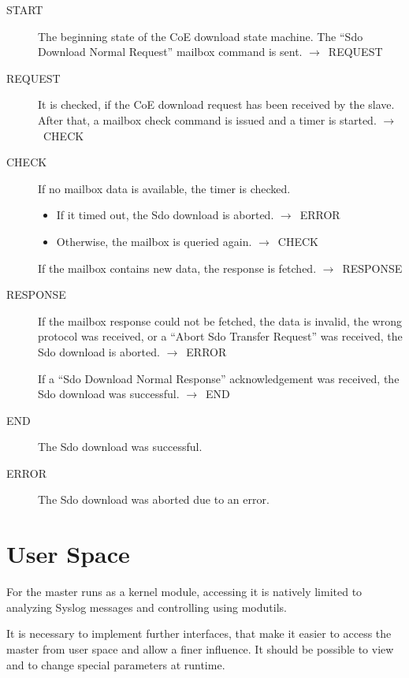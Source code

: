 \documentclass[a4paper,12pt,BCOR6mm,bibtotoc,idxtotoc]{scrbook}
\begin{document}
\begin{description}
\item[START] The beginning state of the CoE download state
  machine. The ``Sdo Download Normal Request'' mailbox command is
  sent. $\rightarrow$~REQUEST

\item[REQUEST] It is checked, if the CoE download request has been
  received by the slave. After that, a mailbox check command is issued
  and a timer is started. $\rightarrow$~CHECK

\item[CHECK] If no mailbox data is available, the timer is checked.
  \begin{itemize}
  \item If it timed out, the Sdo download is aborted.
    $\rightarrow$~ERROR
  \item Otherwise, the mailbox is queried again.
    $\rightarrow$~CHECK
  \end{itemize}

  If the mailbox contains new data, the response is fetched.
  $\rightarrow$~RESPONSE

\item[RESPONSE] If the mailbox response could not be fetched, the data
  is invalid, the wrong protocol was received, or a ``Abort Sdo
  Transfer Request'' was received, the Sdo download is aborted.
  $\rightarrow$~ERROR

  If a ``Sdo Download Normal Response'' acknowledgement was received,
  the Sdo download was successful. $\rightarrow$~END

\item[END] The Sdo download was successful.

\item[ERROR] The Sdo download was aborted due to an error.

\end{description}


\chapter{User Space}
\label{sec:user}

For the master runs as a kernel module, accessing it is natively
limited to analyzing Syslog messages and controlling using modutils.

It is necessary to implement further interfaces, that make it easier
to access the master from user space and allow a finer influence. It
should be possible to view and to change special parameters at runtime.
\end{document}
